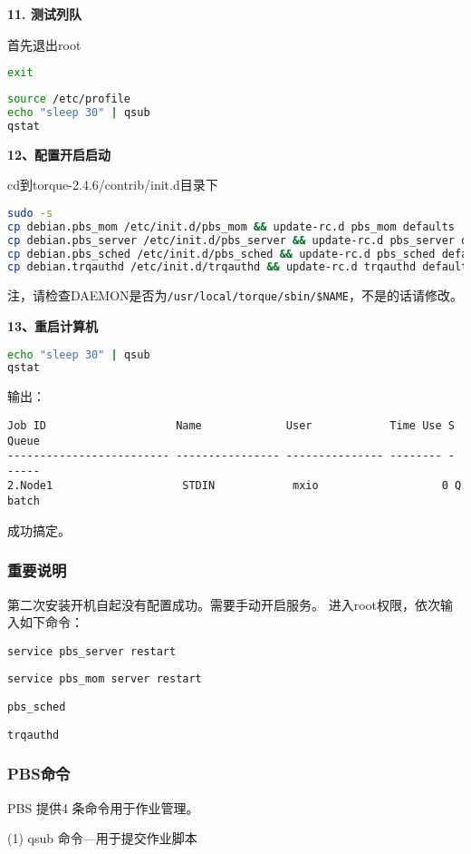 {\textbf{11. 测试列队}

首先退出root
\begin{lstlisting}[language=sh]
exit
\end{lstlisting}
\begin{lstlisting}[language=sh]
source /etc/profile
echo "sleep 30" | qsub
qstat
\end{lstlisting}

\textbf{12、配置开启启动}

cd到torque-2.4.6/contrib/init.d目录下
\begin{lstlisting}[language=sh]
sudo -s
cp debian.pbs_mom /etc/init.d/pbs_mom && update-rc.d pbs_mom defaults
cp debian.pbs_server /etc/init.d/pbs_server && update-rc.d pbs_server defaults
cp debian.pbs_sched /etc/init.d/pbs_sched && update-rc.d pbs_sched defaults
cp debian.trqauthd /etc/init.d/trqauthd && update-rc.d trqauthd defaults
\end{lstlisting}
注，请检查DAEMON是否为\verb|/usr/local/torque/sbin/$NAME|，不是的话请修改。

\textbf{13、重启计算机}
\begin{lstlisting}[language=sh]
echo "sleep 30" | qsub
qstat
\end{lstlisting}
输出：
\begin{verbatim}
Job ID                    Name             User            Time Use S Queue
------------------------- ---------------- --------------- -------- - -----
2.Node1                    STDIN            mxio                   0 Q batch
\end{verbatim}
成功搞定。



\subsubsection{重要说明}
第二次安装开机自起没有配置成功。需要手动开启服务。
进入root权限，依次输入如下命令：

\verb|service pbs_server restart|

\verb|service pbs_mom server restart|

\verb|pbs_sched|

\verb|trqauthd|


\subsubsection{PBS命令}
PBS 提供4 条命令用于作业管理。

(1) qsub 命令—用于提交作业脚本

}
